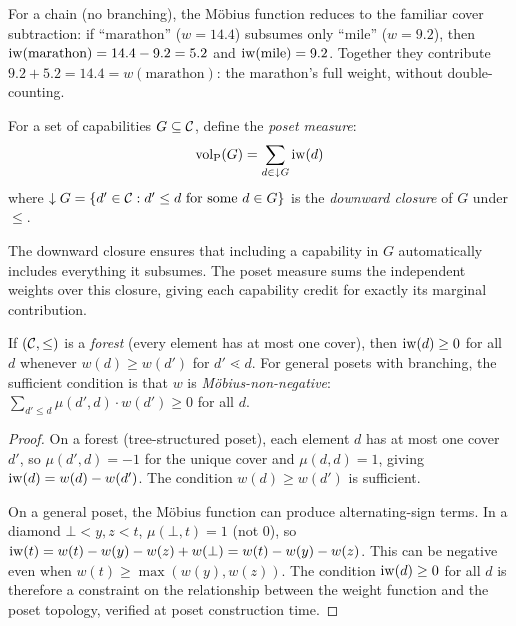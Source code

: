 For a chain (no branching), the M\"{o}bius function reduces to the familiar
cover subtraction: if ``marathon'' ($w = 14.4$) subsumes only ``mile'' ($w =
9.2$), then $\operatorname{iw}(\text{marathon}) = 14.4 - 9.2 = 5.2$ and $\operatorname{iw}(\text{mile})
= 9.2$. Together they contribute $9.2 + 5.2 = 14.4 = w(\text{marathon})$: the
marathon's full weight, without double-counting.

\begin{definition}
\label{def:poset_measure}
For a set of capabilities $G \subseteq \mathcal{C}$, define the \emph{poset measure}:
\begin{equation}
\label{eq:poset_measure}
{\operatorname{vol}_{\mathrm{P}}}(G) = \sum_{d \in \downarrow G} \operatorname{iw}(d)
\end{equation}
where $\downarrow G = \{d' \in \mathcal{C} : d' \leq d \text{ for some } d \in G\}$ is the
    \emph{downward closure} of $G$ under $\leq$.
\end{definition}

The downward closure ensures that including a capability in $G$ automatically
includes everything it subsumes. The poset measure sums the independent
weights over this closure, giving each capability credit for exactly its
marginal contribution.

\begin{lemma}
\label{lem:nonneg_iw}
If $(\mathcal{C}, \leq)$ is a \emph{forest} (every element has at most one cover),
    then $\operatorname{iw}(d) \geq 0$ for all $d$ whenever $w(d) \geq w(d')$ for $d'
    \lessdot d$. For general posets with branching, the sufficient condition
    is that $w$ is \emph{M\"{o}bius-non-negative}: $\sum_{d' \leq d}
    \mu(d', d) \cdot w(d') \geq 0$ for all $d$.
\end{lemma}

\begin{proof}
On a forest (tree-structured poset), each element $d$ has at most one cover
$d'$, so $\mu(d', d) = -1$ for the unique cover and $\mu(d, d) = 1$, giving
$\operatorname{iw}(d) = w(d) - w(d')$. The condition $w(d) \geq w(d')$ is sufficient.

On a general poset, the M\"{o}bius function can produce alternating-sign
terms. In a diamond $\bot < y, z < t$, $\mu(\bot, t) = 1$ (not $0$), so
$\operatorname{iw}(t) = w(t) - w(y) - w(z) + w(\bot) = w(t) - w(y) - w(z)$. This can be
negative even when $w(t) \geq \max(w(y), w(z))$. The condition $\operatorname{iw}(d) \geq
0$ for all $d$ is therefore a constraint on the relationship between the weight
function and the poset topology, verified at poset construction time.
\end{proof}

